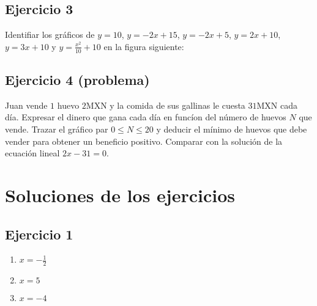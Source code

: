 \subsection*{Ejercicio 3}

Identifiar los gráficos de $y = 10$, $y=-2x+15$, $y=-2x+5$, $y=2x+10$, $y=3x+10$
y $y=\frac{x^2}{10} + 10$ en la figura siguiente:

\begin{center}
\end{center}

\subsection*{Ejercicio 4 (problema)}

Juan vende $1$ huevo $2$MXN y la comida de sus gallinas le cuesta $31$MXN cada día.
Expresar el dinero que gana cada día en funcíon del número de huevos $N$ que
vende. Trazar el gráfico par $0 \leq N \leq 20$ y deducir el mínimo de huevos
que debe vender para obtener un beneficio positivo. Comparar con la solución
de la ecuación lineal $2x - 31 = 0$.

\section{Soluciones de los ejercicios}

\subsection*{Ejercicio 1}

\begin{enumerate}
\item $x = -\frac{1}{2}$
\item $x = 5$
\item $x = -4$
\end{enumerate}

